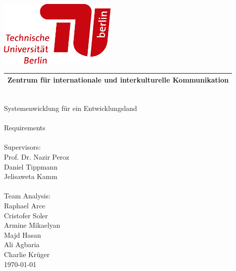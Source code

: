\documentclass[12pt, a4paper, headinclude, footinclude, plainfootsepline]{scrreprt}
\begin{document}
\pagecolor{darkblue}

\hspace*{2cm}\includegraphics[width=57mm]{../Pictures/TULogo}

\begin{tabularx}{\textwidth}{C}
\\
\hline
\color{skyblue} Zentrum für internationale und interkulturelle Kommunikation\\
\hline
\end{tabularx}
\vspace*{5cm}\\
\hspace*{3cm}\color{skyblue}\Huge Systemenwicklung für ein Entwicklungsland 
\\
\vspace*{0,7cm}\\
\hspace*{3cm}\Large Requirements
\\
\vspace*{4cm}\\
\hspace*{3cm}\Large Supervisors:
\\
{\normalsize
	\hspace*{3.5cm}Prof. Dr. Nazir Peroz\\
	\hspace*{3.5cm}Daniel Tippmann\\
	\hspace*{3.5cm}Jelisaweta Kamm\\
}
\vspace*{0.5cm}\\
\hspace*{3cm}\Large Team Analysis:\\
{\normalsize
	\hspace*{3.5cm}Raphael Arce\\
	\hspace*{3.5cm}Cristofer Soler\\
	\hspace*{3.5cm}Armine Mikaelyan\\
	\hspace*{3.5cm}Majd Hasan\\
	\hspace*{3.5cm}Ali Agbaria\\
	\hspace*{3.5cm}Charlie Krüger\\
}
\hspace*{14cm}\large \today
\end{document}
